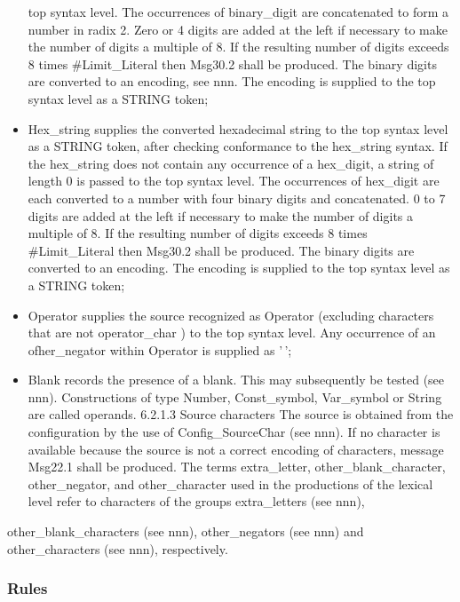 \begin{itemize}
  top syntax level. The occurrences of binary\_digit are concatenated to
  form a number in radix 2. Zero or 4 digits are added at the left if
  necessary to make the number of digits a multiple of 8. If the
  resulting number of digits exceeds 8 times \#Limit\_Literal then
  Msg30.2 shall be produced. The binary digits are converted to an
  encoding, see nnn. The encoding is supplied to the top syntax level as
  a STRING token;
\item
  Hex\_string supplies the converted hexadecimal string to the top
  syntax level as a STRING token, after checking conformance to the
  hex\_string syntax. If the hex\_string does not contain any occurrence
  of a hex\_digit, a string of length 0 is passed to the top syntax
  level. The occurrences of hex\_digit are each converted to a number
  with four binary digits and concatenated. 0 to 7 digits are added at
  the left if necessary to make the number of digits a multiple of 8. If
  the resulting number of digits exceeds 8 times \#Limit\_Literal then
  Msg30.2 shall be produced. The binary digits are converted to an
  encoding. The encoding is supplied to the top syntax level as a STRING
  token;
\item
  Operator supplies the source recognized as Operator (excluding
  characters that are not operator\_char ) to the top syntax level. Any
  occurrence of an ofher\_negator within Operator is supplied as '\,';
\item
  Blank records the presence of a blank. This may subsequently be tested
  (see nnn). Constructions of type Number, Const\_symbol, Var\_symbol or
  String are called operands. 6.2.1.3 Source characters The source is
  obtained from the configuration by the use of Config\_SourceChar (see
  nnn). If no character is available because the source is not a correct
  encoding of characters, message Msg22.1 shall be produced. The terms
  extra\_letter, other\_blank\_character, other\_negator, and
  other\_character used in the productions of the lexical level refer to
  characters of the groups extra\_letters (see nnn),
\end{itemize}

other\_blank\_characters (see nnn), other\_negators (see nnn) and
other\_characters (see nnn), respectively.

\hypertarget{rules}{%
\subsubsection{Rules}\label{rules}}


